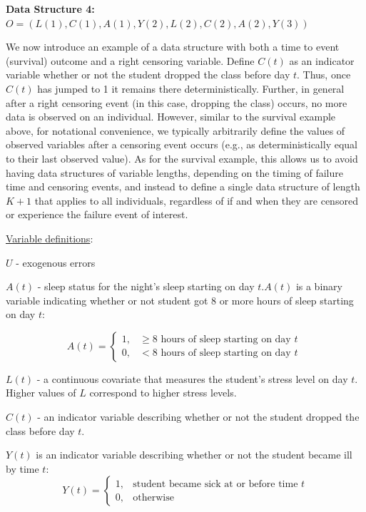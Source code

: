\documentclass{exam}
\newenvironment{packed_item}{
\begin{itemize}
 \setlength{\itemsep}{0pt}
  \setlength{\parskip}{0pt}
  \setlength{\parsep}{0pt}
}{\end{itemize}}
\begin{document}
\noindent\large\textbf{Data Structure 4: $O = (L(1), C(1), A(1), Y(2), L(2), C(2), A(2), Y(3))$}
\normalsize


We now introduce an example of a data structure with both a time to event (survival) outcome and a right censoring variable. Define $C(t)$ as an indicator variable whether or not the student dropped the class before day $t$. Thus, once $C(t)$ has jumped to 1 it remains there deterministically. Further, in general after a right censoring event (in this case, dropping the class) occurs, no more data is observed on an individual. However, similar to the survival example above, for notational convenience, we typically arbitrarily define the values of observed variables after a censoring event occurs (e.g., as deterministically equal to their last observed value). As for the survival example, this allows us to avoid having data structures of variable lengths, depending on the timing of failure time and censoring events, and instead to define a single data structure of length $K+1$ that applies to all individuals, regardless of if and when they are censored or experience the failure event of interest.

\underline{Variable definitions}:
\begin{packed_item}
\item[] $U$ - exogenous errors
\item[] $A(t)$ - sleep status for the night's sleep starting on day $t$.$A(t)$ is a binary variable indicating whether or not student got 8 or more hours of sleep starting on day $t$:

  \begin{equation*}
    A(t)=
    \begin{cases}
      1, & \geq 8 \text{ hours of sleep starting on day $t$}\ \\
      0, & < 8 \text{ hours of sleep starting on day $t$}
    \end{cases}
  \end{equation*}


  
\item[] $L(t)$ - a continuous covariate that measures the student's stress level on day $t$. Higher values of $L$ correspond to higher stress levels.
\item[] $C(t)$ - an indicator variable describing whether or not the student dropped the class before day $t$. 
\item[] $Y(t)$ is an indicator variable describing whether or not the student became ill by time $t$:
  \begin{equation*}
    Y(t)=
    \begin{cases}
      1, & \text{student became sick at or before time $t$} \\
      0, & \text{otherwise}
    \end{cases}
  \end{equation*}
\end{packed_item}
\end{document}
